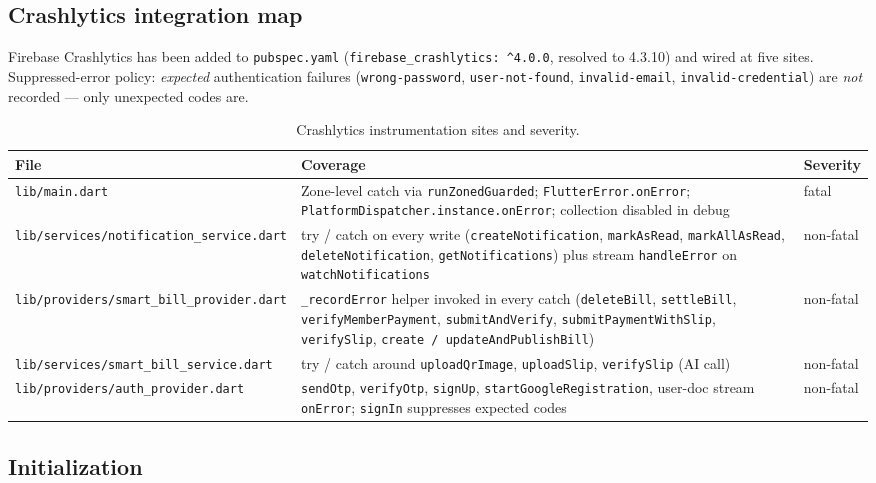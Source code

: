 \documentclass[11pt,a4paper]{article}
\begin{document}
\subsection{Crashlytics integration map}

Firebase Crashlytics has been added to \texttt{pubspec.yaml}
(\texttt{firebase\_crashlytics: \^{}4.0.0}, resolved to 4.3.10) and wired
at five sites. Suppressed-error policy: \emph{expected} authentication
failures (\texttt{wrong-password}, \texttt{user-not-found},
\texttt{invalid-email}, \texttt{invalid-credential}) are \emph{not}
recorded --- only unexpected codes are.

\begin{table}[h]
\centering\small
\begin{tabularx}{\linewidth}{@{}lXl@{}}
\toprule
\textbf{File} & \textbf{Coverage} & \textbf{Severity} \\
\midrule
\texttt{lib/main.dart}                       & Zone-level catch via \texttt{runZonedGuarded}; \texttt{FlutterError.onError}; \texttt{PlatformDispatcher.instance.onError}; collection disabled in debug & fatal \\
\texttt{lib/services/notification\_service.dart} & try / catch on every write (\texttt{createNotification}, \texttt{markAsRead}, \texttt{markAllAsRead}, \texttt{deleteNotification}, \texttt{getNotifications}) plus stream \texttt{handleError} on \texttt{watchNotifications} & non-fatal \\
\texttt{lib/providers/smart\_bill\_provider.dart} & \texttt{\_recordError} helper invoked in every catch (\texttt{deleteBill}, \texttt{settleBill}, \texttt{verifyMemberPayment}, \texttt{submitAndVerify}, \texttt{submitPaymentWithSlip}, \texttt{verifySlip}, \texttt{create / updateAndPublishBill}) & non-fatal \\
\texttt{lib/services/smart\_bill\_service.dart} & try / catch around \texttt{uploadQrImage}, \texttt{uploadSlip}, \texttt{verifySlip} (AI call) & non-fatal \\
\texttt{lib/providers/auth\_provider.dart} & \texttt{sendOtp}, \texttt{verifyOtp}, \texttt{signUp}, \texttt{startGoogleRegistration}, user-doc stream \texttt{onError}; \texttt{signIn} suppresses expected codes & non-fatal \\
\bottomrule
\end{tabularx}
\caption{Crashlytics instrumentation sites and severity.}
\end{table}

\subsection{Initialization}
\end{document}
